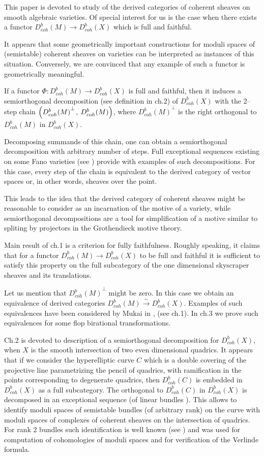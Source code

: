 \documentclass[12pt]{article}
\def\db#1{ D^b_{coh}({#1})}
\def\lto{\longrightarrow}
\begin{document}
This paper is devoted to study of the derived categories of coherent sheaves on smooth algebraic varieties. Of special interest for us is the case when there exists a functor ${\db M}\lto {\db X}$ which is full and faithful.

It appears that some geometrically important constructions for moduli spaces of (semistable) coherent sheaves on varieties can be interpreted as instances of this situation. Conversely, we are convinced that any example of such a functor is geometrically meaningful.

If a functor $\Phi: {\db M}\lto {\db X}$ is full and faithful, then it induces  a semiorthogonal decomposition (see definition in ch.2) of ${\db X}$ with the 2--step chain $\Bigl( {\db M}^{\perp}$, ${\db M} \Bigl)$, where ${\db M}^{\perp}$ is the right orthogonal to ${\db M}$ in ${\db X}$.

Decomposing summands of this chain, one can obtain a  semiorthogonal decomposition with arbitrary number of steps.
Full exceptional sequences existing on some Fano varieties (see \cite{K}) provide with examples of such decompositions. For this case, every step of the chain is equivalent to the derived category of vector spaces or, in other words, sheaves over the point.

This leads to the idea that the derived category of coherent sheaves might be reasonable to consider as an incarnation of the motive of a variety, while semiorthogonal decompositions are a tool for  simplification of a motive similar to spliting by projectors in the Grothendieck motive theory.

Main result of ch.1 is a criterion for fully faithfulness. Roughly speaking, it claims that for a functor ${\db M}\lto{\db X}$ to be full and faithful it is sufficient to satisfy this property on the full subcategory of the one dimensional skyscraper sheaves and its translations.

Let us mention that ${\db M}^{\perp}$ might be zero. In this case we obtain an equivalence of derived categories ${\db M}\stackrel{\sim}{\lto}{\db X}$. Examples of such equivalences have been considered by Mukai in \cite{Mu}, \cite{Mu2} (see ch.1). In ch.3 we prove such equivalences for some flop birational transformations.

Ch.2 is devoted to description of a semiorthogonal decomposition for ${\db X}$, when $X$ is the smooth intersection of two even dimensional quadrics. It appears that if we consider the hyperelliptic curve $C$ which is a double covering of the projective line parametrizing the pencil of quadrics, with ramification in the points corresponding to degenerate quadrics, then ${\db C}$ is embedded in ${\db X}$ as a full subcategory. The orthogonal to ${\db C}$ in ${\db X}$ is decomposed in an exceptional sequence (of linear bundles ). This allows to identify moduli spaces of semistable bundles (of arbitrary rank) on the curve with moduli spaces of complexes of coherent sheaves on the intersection of quadrics. For rank 2 bundles such identification is well known (see \cite{DR}) and was used for computation of cohomologies of moduli spaces \cite{Bar} and for verification of the Verlinde formula.
\end{document}
